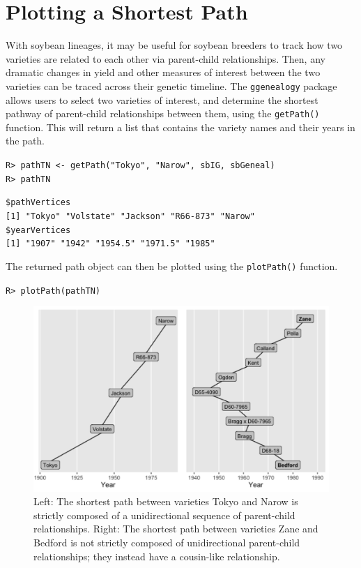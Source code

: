 \documentclass[11pt,a4paper,oldfontcommands,openany]{memoir}
\DeclareRobustCommand{\mybox}[2][gray!15]{%
\begin{tcolorbox}[   %
        breakable,
        left=0pt,
        right=0pt,
        top=0pt,
        bottom=0pt,
        colback=#1,
        colframe=#1,
        width=\dimexpr\textwidth\relax, 
        enlarge left by=0mm,
        boxsep=5pt,
        arc=0pt,outer arc=0pt,
        ]
        #2
\end{tcolorbox}
}
\numberwithin{equation}{section} %
\newcommand{\code}[1]{{\texttt{#1}}}
\newcommand{\pkg}[1]{{\texttt{#1}}}
\begin{document}
\section{Plotting a Shortest Path}

With soybean lineages, it may be useful for soybean breeders to track how two varieties are related to each other via parent-child relationships. Then, any dramatic changes in yield and other measures of interest between the two varieties can be traced across their genetic timeline. The \pkg{ggenealogy} package allows users to select two varieties of interest, and determine the shortest pathway of parent-child relationships between them, using the \code{getPath()} function. This will return a list that contains the variety names and their years in the path.

\mybox{
\texttt{R> pathTN <- getPath("Tokyo", "Narow", sbIG, sbGeneal)}\\
\texttt{R> pathTN}
}

\mybox[green!10]{
\texttt{\$pathVertices}\\
\texttt{[1] "Tokyo"    "Volstate" "Jackson"  "R66-873"  "Narow"}\\   

\texttt{\$yearVertices}\\
\texttt{[1] "1907"   "1942"   "1954.5" "1971.5" "1985"}
}

The returned path object can then be plotted using the \code{plotPath()} function.

\mybox{
\texttt{R> plotPath(pathTN)}
}

\begin{figure}[h]
    \begin{framed}
    \centering
    \includegraphics[width=\textwidth]{pathTNZB}
    \end{framed}
    \caption{Left: The shortest path between varieties Tokyo and Narow is strictly composed of a unidirectional sequence of parent-child relationships. Right: The shortest path between varieties Zane and Bedford is not strictly composed of unidirectional parent-child relationships; they instead have a cousin-like relationship.}
    \label{fig:pathTNZB}
\end{figure}
\end{document}
